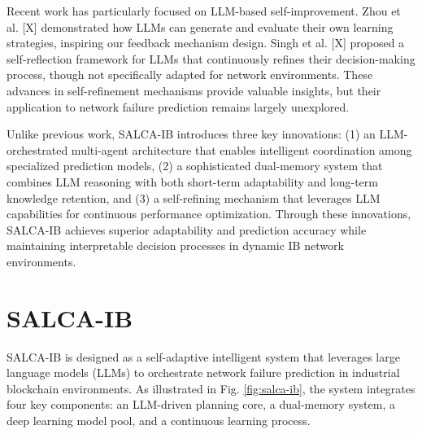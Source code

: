 \documentclass[conference]{IEEEtran}
\begin{document}
Recent work has particularly focused on LLM-based self-improvement. Zhou et al. [X] demonstrated how LLMs can generate and evaluate their own learning strategies, inspiring our feedback mechanism design. Singh et al. [X] proposed a self-reflection framework for LLMs that continuously refines their decision-making process, though not specifically adapted for network environments. These advances in self-refinement mechanisms provide valuable insights, but their application to network failure prediction remains largely unexplored.

Unlike previous work, SALCA-IB introduces three key innovations: (1) an LLM-orchestrated multi-agent architecture that enables intelligent coordination among specialized prediction models, (2) a sophisticated dual-memory system that combines LLM reasoning with both short-term adaptability and long-term knowledge retention, and (3) a self-refining mechanism that leverages LLM capabilities for continuous performance optimization. Through these innovations, SALCA-IB achieves superior adaptability and prediction accuracy while maintaining interpretable decision processes in dynamic IB network environments.


%
%
%
%


\section{SALCA-IB}

SALCA-IB is designed as a self-adaptive intelligent system that leverages large language models (LLMs) to orchestrate network failure prediction in industrial blockchain environments. As illustrated in Fig. \ref{fig:salca-ib}, the system integrates four key components: an LLM-driven planning core, a dual-memory system, a deep learning model pool, and a continuous learning process.
\end{document}

